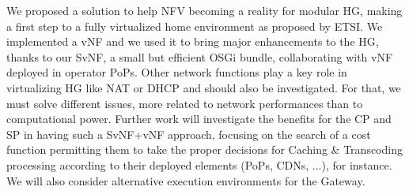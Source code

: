 We proposed a solution to help NFV becoming a reality for modular HG, making a first step to a fully virtualized home environment as proposed by ETSI.
We implemented a vNF and we used it to bring major enhancements to the HG, thanks to our SvNF, a small but efficient OSGi bundle, collaborating with vNF deployed in operator PoPs.
Other network functions play a key role in virtualizing HG like NAT or DHCP and should also be investigated.
For that, we must solve different issues, more related to network performances than to computational power. 
Further work will investigate the benefits for the CP and SP in having such a SvNF+vNF approach, focusing on the search of a cost function permitting them to take the proper decisions for Caching \& Transcoding processing according to their deployed elements (PoPs, CDNs, ...), for instance. 
We will also consider alternative execution environments for the Gateway.



